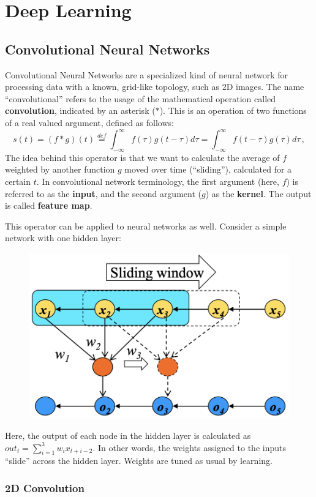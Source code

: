 \chapter{Deep Learning}

\section{Convolutional Neural Networks}

Convolutional Neural Networks are a specialized kind of neural network for processing data with a known, grid-like topology, such as 2D images. The name ``convolutional'' refers to the usage of the mathematical operation called \textbf{convolution}, indicated by an asterisk ($*$). This is an operation of two functions of a real valued argument, defined as follows:
\begin{equation*}
    s(t) = (f * g)(t) \stackrel{def}{=} \int_{-\infty}^{\infty} f(\tau)g(t - \tau) d \tau = \int_{-\infty}^{\infty} f(t - \tau)g(\tau) d\tau \,,
\end{equation*}
The idea behind this operator is that we want to calculate the average of $f$ weighted by another function $g$ moved over time (``sliding''), calculated for a certain $t$. In convolutional network terminology, the first argument (here, $f$) is referred to as the \textbf{input}, and the second argument ($g$) as the \textbf{kernel}. The output is called \textbf{feature map}.

This operator can be applied to neural networks as well. Consider a simple network with one hidden layer:
\begin{figure}[h]
    \centering
    \includegraphics[width=0.45\linewidth]{img/CNN_simple.png}
\end{figure}

Here, the output of each node in the hidden layer is calculated as $out_t = \sum_{i=1}^3 w_i x_{t+i-2}$. In other words, the weights assigned to the inputs ``slide'' across the hidden layer. Weights are tuned as usual by learning.

\subsection{2D Convolution}

